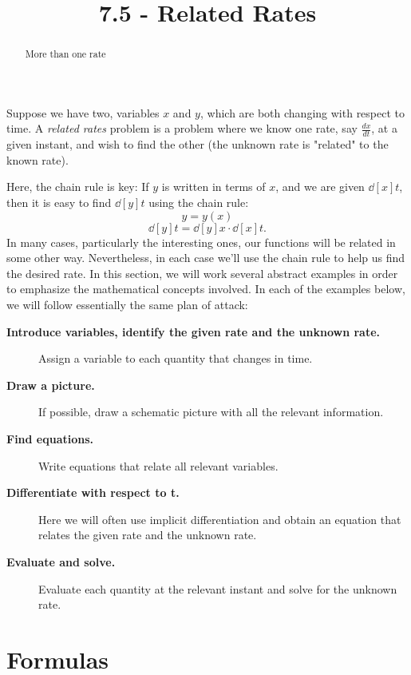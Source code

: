 \documentclass{ximera}
\title{7.5 - Related Rates}
\begin{document}
\begin{abstract}
More than one rate
\end{abstract}
\maketitle
	
	
	Suppose we have two, variables $x$ and $y$, which are both changing with
	respect to time.  A \textit{related rates} problem is a problem where
	we know one rate, say $\frac{dx}{dt}$, at a given instant, and wish to find the other (the unknown rate is "related" to the known rate).
	
	Here, the chain rule is key: If $y$ is written in terms of $x$, and we
	are given $\dd[x]{t}$, then it is easy to find $\dd[y]{t}$ using the
	chain rule:
	\[
	y=y(x)
	\]
	\[
	\dd[y]{t}=\dd[y]{x}\cdot \dd[x]{t}.
	\]
	In many cases, particularly the interesting ones, our functions will
	be related in some other way. Nevertheless, in each case we'll use the
	chain rule to help us find the desired rate. In this
	section, we will work several abstract examples in order to emphasize
	the mathematical concepts involved. In each of the examples below, we
	will follow essentially the same plan of attack:
	
	
	
	\begin{description}
		\item[\textbf{Introduce variables, identify the given rate and the unknown rate.}]
		
		Assign a variable to each quantity that changes in time.
		\item[\textbf{Draw a picture.}] If possible, draw a schematic picture with all the relevant information. 
		\item[\textbf{Find equations.}] Write equations that relate all
		relevant variables.
		\item[\textbf{Differentiate with respect to t.}] Here we will often use
		implicit differentiation and obtain an equation that relates the given rate and the unknown rate. 
		\item[\textbf{Evaluate and solve.}] Evaluate
		each quantity at the relevant instant and solve for the unknown rate.
		
	\end{description}
	
	
	
	
	\section{Formulas}
	
\end{document}
